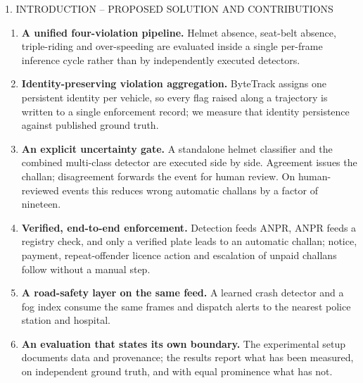 \documentclass[aspectratio=169,10pt,t]{beamer}
\begin{document}
\begin{frame}{1. INTRODUCTION -- PROPOSED SOLUTION AND CONTRIBUTIONS}
\scriptsize
\begin{enumerate}\setlength{\itemsep}{0.1em}
\item \textbf{A unified four-violation pipeline.} Helmet absence, seat-belt absence, triple-riding and over-speeding
are evaluated inside a single per-frame inference cycle rather than by independently executed detectors.
\item \textbf{Identity-preserving violation aggregation.} ByteTrack assigns one persistent identity per vehicle, so
every flag raised along a trajectory is written to a single enforcement record; we measure that identity persistence
against published ground truth.
\item \textbf{An explicit uncertainty gate.} A standalone helmet classifier and the combined multi-class detector are
executed side by side. Agreement issues the challan; disagreement forwards the event for human review. On
human-reviewed events this reduces wrong automatic challans by a factor of nineteen.
\item \textbf{Verified, end-to-end enforcement.} Detection feeds ANPR, ANPR feeds a registry check, and only a
verified plate leads to an automatic challan; notice, payment, repeat-offender licence action and escalation of unpaid
challans follow without a manual step.
\item \textbf{A road-safety layer on the same feed.} A learned crash detector and a fog index consume the same frames
and dispatch alerts to the nearest police station and hospital.
\item \textbf{An evaluation that states its own boundary.} The experimental setup documents data and provenance; the
results report what has been measured, on independent ground truth, and with equal prominence what has not.
\end{enumerate}
\vspace{0.3em}
\centering
{}
\end{frame}
\end{document}

